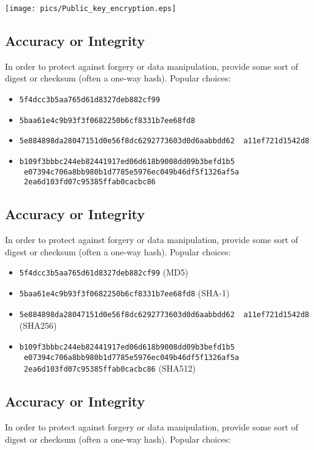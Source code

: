 \documentclass[xga]{xdvislides}
\begin{document}
\begin{center}
	\texttt{[image: pics/Public\_key\_encryption.eps]}
 \end{center}

\subsection{Accuracy or Integrity}
In order to protect against forgery or data manipulation, provide some sort of
digest or checksum (often a one-way hash).  Popular choices:

\begin{itemize}
	\item {\tt 5f4dcc3b5aa765d61d8327deb882cf99}
	\item {\tt 5baa61e4c9b93f3f0682250b6cf8331b7ee68fd8}
	\item {\tt 5e884898da28047151d0e56f8dc6292773603d0d6aabbdd62 \
                   a11ef721d1542d8}
	\item {\tt b109f3bbbc244eb82441917ed06d618b9008dd09b3befd1b5 \
                   e07394c706a8bb980b1d7785e5976ec049b46df5f1326af5a \
                   2ea6d103fd07c95385ffab0cacbc86}
\end{itemize}

\subsection{Accuracy or Integrity}
In order to protect against forgery or data manipulation, provide some sort of
digest or checksum (often a one-way hash).  Popular choices:

\begin{itemize}
	\item {\tt 5f4dcc3b5aa765d61d8327deb882cf99} (MD5)
	\item {\tt 5baa61e4c9b93f3f0682250b6cf8331b7ee68fd8} (SHA-1)
	\item {\tt 5e884898da28047151d0e56f8dc6292773603d0d6aabbdd62 \
                   a11ef721d1542d8} (SHA256)
	\item {\tt b109f3bbbc244eb82441917ed06d618b9008dd09b3befd1b5 \
                   e07394c706a8bb980b1d7785e5976ec049b46df5f1326af5a \
                   2ea6d103fd07c95385ffab0cacbc86} (SHA512)
\end{itemize}

\subsection{Accuracy or Integrity}
In order to protect against forgery or data manipulation, provide some sort of
digest or checksum (often a one-way hash).  Popular choices:
\end{document}

